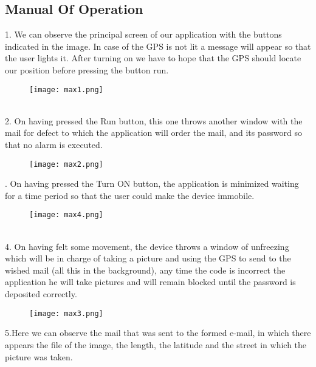 \documentclass[12pt,letterpaper]{article}
\begin{document}
 \subsection{Manual Of Operation}
1. We can observe the principal screen of our application with the buttons indicated in the image. In case of the GPS is not lit a message will appear so that the user lights it. After turning on we have to hope that the GPS should locate our position before pressing the button run.
\begin{figure}[h]
\begin{center}
{\tiny }\texttt{[image: max1.png]}\\
\end{center}
\end{figure}\\
2. On having pressed the Run button, this one throws another window with the mail for defect to which the application will order the mail, and its password so that no alarm is executed.
\begin{figure}[h]
\begin{center}
\texttt{[image: max2.png]}\\
\end{center}
\end{figure}
. On having pressed the Turn ON button, the application is minimized waiting for a time period so that the user could make the device immobile.
\begin{figure}[h]
\begin{center}
\texttt{[image: max4.png]}\\
\end{center}
\end{figure}\\
4. On having felt some movement, the device throws a window of unfreezing which will be in charge of taking a picture and using the GPS to send to the wished mail (all this in the background), any time the code is incorrect the application he will take pictures and will remain blocked until the password is deposited correctly.
\begin{figure}[h]
\begin{center}
\texttt{[image: max3.png]}\\
\end{center}
\end{figure}
\newpage
5.Here we can observe the mail that was sent to the formed e-mail, in which there appears the file of the image, the length, the latitude and the street in which the picture was taken.
\end{document}
